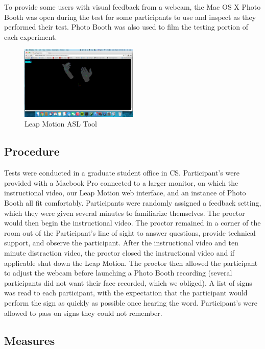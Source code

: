 \documentclass{sigchi}
\begin{document}
To provide some users with visual feedback from a webcam, the Mac OS X Photo Booth was open during the test for some participants to use and inspect as they performed their test. Photo Booth was also used to film the testing portion of each experiment.


\begin{figure}
\centering
\includegraphics[width=0.5\textwidth]{demo.png}
\caption{Leap Motion ASL Tool}
\label{demo}
\end{figure}




\subsection{Procedure}
Tests were conducted in a graduate student office in CS.  Participant’s were provided with a Macbook Pro connected to a larger monitor, on which the instructional video, our Leap Motion web interface, and an instance of Photo Booth all fit comfortably.  Participants were randomly assigned a feedback setting, which they were given several minutes to familiarize themselves.  The proctor would then begin the instructional video.  The proctor remained in a corner of the room out of the Participant’s line of sight to answer questions, provide technical support, and observe the participant.  After the instructional video and ten minute distraction video, the proctor closed the instructional video and if applicable shut down the Leap Motion.  The proctor then allowed the participant to adjust the webcam before launching a Photo Booth recording (several participants did not want their face recorded, which we obliged).  A list of signs was read to each participant, with the expectation that the participant would perform the sign as quickly as possible once hearing the word.  Participant’s were allowed to pass on signs they could not remember.  

\subsection{Measures}
\end{document}
